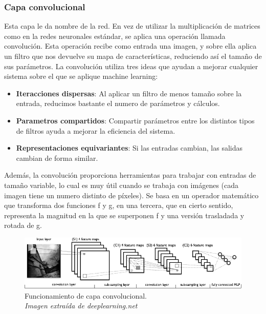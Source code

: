 \subsubsection{Capa convolucional}
Esta capa le da nombre de la red. En vez de utilizar la multiplicación de matrices como en la redes neuronales estándar, se aplica una operación llamada convolución. Esta operación recibe como entrada una imagen, y sobre ella aplica un filtro que nos devuelve su mapa de características, reduciendo así el tamaño de sus parámetros. La convolución utiliza tres ideas que ayudan a mejorar cualquier sistema sobre el que se aplique machine learning:
\begin{itemize}
\item{\textbf{Iteracciones dispersas}:}
Al aplicar un filtro de menos tamaño sobre la entrada, reducimos bastante el numero de parámetros y cálculos.
\item{\textbf{Parametros compartidos}:}
Compartir parámetros entre los distintos tipos de filtros ayuda a mejorar la eficiencia del sistema.
\item{\textbf{Representaciones equivariantes}:}
Si las entradas cambian, las salidas cambian de forma similar.
\end{itemize}
Además, la convolución proporciona herramientas para trabajar con entradas de tamaño variable, lo cual es muy útil cuando se trabaja con imágenes (cada imagen tiene un numero distinto de píxeles). Se basa en un operador matemático que transforma dos funciones f y g, en una tercera, que en cierto sentido, representa la magnitud en la que se superponen f y una versión trasladada y rotada de g.
\begin{figure}[htp]
\centering
\includegraphics[scale=0.7]{images/conv_layer.png}
\caption{Funcionamiento de capa convolucional.\\\textit{Imagen extraída de deeplearning.net}}
\end{figure}\\

